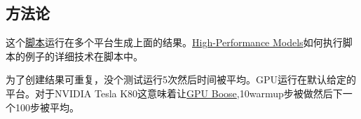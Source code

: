  \subsection{方法论}
 这个\href{https://github.com/tensorflow/benchmarks/tree/master/scripts/tf_cnn_benchmarks}{脚本}运行在多个平台生成上面的结果。\href{https://www.tensorflow.org/performance/performance_models}{High-Performance Models}如何执行脚本的例子的详细技术在脚本中。

 为了创建结果可重复，没个测试运行5次然后时间被平均。GPU运行在默认给定的平台。对于NVIDIA Tesla K80这意味着让\href{https://devblogs.nvidia.com/parallelforall/increase-performance-gpu-boost-k80-autoboost/}{GPU Boose},10warmup步被做然后下一个100步被平均。
